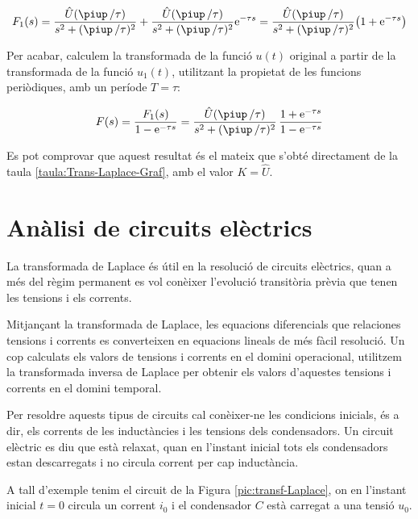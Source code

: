 \begin{exemple}
    \[
        F_1(s) = \frac{\hat{U} (\piup\,/\tau)}{s^2 + (\piup\,/\tau)^2} +
        \frac{\hat{U} (\piup\,/\tau)}{s^2 + (\piup\,/\tau)^2} \eu^{-\tau s} =
        \frac{\hat{U} (\piup\,/\tau)}{s^2 + (\piup\,/\tau)^2} \bigl( 1+\eu^{-\tau s}
        \big)
    \]

    Per acabar, calculem la transformada de la funció $u(t)$ original a
    partir de la transformada de la funció $u_1(t)$, utilitzant la
    propietat de les funcions periòdiques, amb un període $T=\tau$:

    \[
        F(s) = \frac{F_1(s)}{1-\eu^{-\tau s}} =
        \frac{\hat{U} (\piup\,/\tau) }{s^2 + (\piup\,/\tau)^2}\,\frac{1+\eu^{-\tau s}}{1-\eu^{-\tau
        s}}
    \]

    Es pot comprovar que aquest resultat és el mateix que s'obté directament de la taula \vref{taula:Trans-Laplace-Graf}, amb el valor $K=\hat{U}$.
\end{exemple}

\section{Anàlisi de circuits elèctrics}

La transformada de Laplace és útil en la resolució de circuits
elèctrics, quan a més del règim permanent es vol conèixer
l'evolució transitòria prèvia que tenen les tensions i els corrents.

Mitjançant la transformada de Laplace, les equacions diferencials
que relaciones tensions i corrents es converteixen en equacions
lineals de més fàcil resolució. Un cop calculats els valors de
tensions i corrents en el domini operacional, utilitzem la
transformada inversa de Laplace per obtenir els valors d'aquestes
tensions i corrents en el domini temporal.

Per resoldre aquests tipus de circuits cal conèixer-ne les
condicions inicials, és a dir, els corrents de les inductàncies i
les tensions dels condensadors. Un circuit elèctric es diu que està
relaxat, quan en l'instant inicial tots els condensadors estan
descarregats i no circula corrent per cap inductància.

A tall d'exemple tenim el circuit de la Figura
\vref{pic:transf-Laplace}, on en l'instant inicial $t=0$ circula un
corrent $i_0$ i el condensador $C$ està carregat a una tensió $u_0$.

\begin{center}
    
    \label{pic:transf-Laplace}
\end{center}

